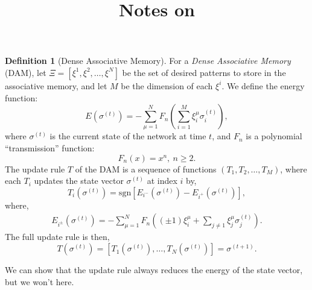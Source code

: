 \documentclass{article}
\title{Notes on \textcite{bao_capacity_2022}}
\theoremstyle{definition}
\newtheorem{definition}{Definition}
\begin{document}
\maketitle

\begin{definition}[Dense Associative Memory]\label{def:dam}
  For a \textit{Dense Associative Memory} (DAM), let
   $\Xi = [\xi^1, \xi^2, \dots, \xi^N]$ be the set of desired patterns
  to store in the associative memory, and let $M$ be the dimension of each 
  $\xi^i$. We define the energy function:
  \begin{equation}
    E (\sigma^{(t)}) = - \sum^N_{\mu=1} F_n \left(\sum^M_{i=1} \xi^\mu_i \sigma_i^{(t)} \right),
  \end{equation}
  where $\sigma^{(t)}$ is the current state of the network at time $t$, and 
  $F_n$ is a polynomial ``transmission'' function:
  \begin{equation}
    F_n (x) = x^n,~n \geq 2.
  \end{equation}
  The update rule $T$ of the DAM is a sequence of functions $(T_1, T_2, \dots, T_M)$,
  where each $T_i$ updates the state vector $\sigma^{(t)}$ at index $i$ by,
  \begin{equation}
    T_i (\sigma^{(t)}) = \text{sgn} \left[ E_{i^-}(\sigma^{(t)}) - E_{i^+} (\sigma^{(t)}) \right],
  \end{equation}
  where,
  \begin{align}
  E_{i^\pm} (\sigma^{(t)}) = - \sum^N_{\mu=1} F_n \left( (\pm 1) \xi^\mu_i + \sum_{j \neq 1} \xi^\mu_j \sigma^{(t)}_j \right).
  \end{align}
  The full update rule is then,
  \begin{equation}\label{def:dam:update}
  T(\sigma^{(t)}) = [T_1 (\sigma^{(t)}), \dots, T_N (\sigma^{(t)})] = \sigma^{(t+1)}.
  \end{equation}
\end{definition}

We can show that the update rule always reduces the energy of the state vector,
but we won't here.
\end{document}
